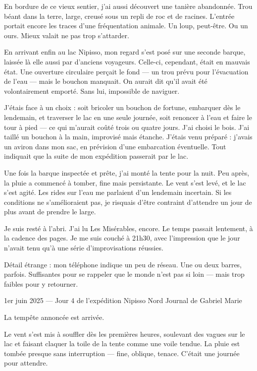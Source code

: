 En bordure de ce vieux sentier, j’ai aussi découvert une tanière abandonnée. Trou béant dans la terre, large, creusé sous un repli de roc et de racines. L’entrée portait encore les traces d’une fréquentation animale. Un loup, peut-être. Ou un ours. Mieux valait ne pas trop s’attarder.

En arrivant enfin au lac Nipisso, mon regard s’est posé sur une seconde barque, laissée là elle aussi par d’anciens voyageurs. Celle-ci, cependant, était en mauvais état. Une ouverture circulaire perçait le fond — un trou prévu pour l’évacuation de l’eau — mais le bouchon manquait. On aurait dit qu’il avait été volontairement emporté. Sans lui, impossible de naviguer.

J’étais face à un choix : soit bricoler un bouchon de fortune, embarquer dès le lendemain, et traverser le lac en une seule journée, soit renoncer à l’eau et faire le tour à pied — ce qui m’aurait coûté trois ou quatre jours. J’ai choisi le bois. J’ai taillé un bouchon à la main, improvisé mais étanche. J’étais venu préparé : j’avais un aviron dans mon sac, en prévision d’une embarcation éventuelle. Tout indiquait que la suite de mon expédition passerait par le lac.

Une fois la barque inspectée et prête, j’ai monté la tente pour la nuit. Peu après, la pluie a commencé à tomber, fine mais persistante. Le vent s’est levé, et le lac s’est agité. Les rides sur l’eau me parlaient d’un lendemain incertain. Si les conditions ne s’amélioraient pas, je risquais d’être contraint d’attendre un jour de plus avant de prendre le large.

Je suis resté à l’abri. J’ai lu Les Misérables, encore. Le temps passait lentement, à la cadence des pages. Je me suis couché à 21h30, avec l’impression que le jour n’avait tenu qu’à une série d’improvisations réussies.

Détail étrange : mon téléphone indique un peu de réseau. Une ou deux barres, parfois. Suffisantes pour se rappeler que le monde n’est pas si loin — mais trop faibles pour y retourner.





1er juin 2025 — Jour 4 de l’expédition Nipisso Nord
Journal de Gabriel Marie

La tempête annoncée est arrivée.

Le vent s’est mis à souffler dès les premières heures, soulevant des vagues sur le lac et faisant claquer la toile de la tente comme une voile tendue. La pluie est tombée presque sans interruption — fine, oblique, tenace. C’était une journée pour attendre.

